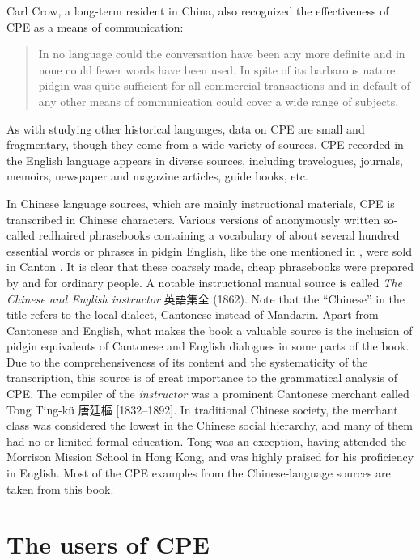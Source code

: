 \documentclass[english,output=paper,colorlinks,citecolor=brown]{../langscibook}
\begin{document}
Carl Crow, a long-term resident in China, also recognized the effectiveness of CPE as a means of communication:

\begin{quote}
    In no language could the conversation have been any more definite and in none could fewer words have been used. In spite of its barbarous nature pidgin was quite sufficient for all commercial transactions and in default of any other means of communication could cover a wide range of subjects. \citep[31]{Crow2011}
\end{quote}

As with studying other historical languages, data on CPE are small and fragmentary, though they come from a wide variety of sources. CPE recorded in the English language appears in diverse sources, including travelogues, journals, memoirs, newspaper and magazine articles, guide books, etc.

In Chinese language sources, which are mainly instructional materials, CPE is transcribed in Chinese characters. Various versions of anonymously written so-called redhaired phrasebooks containing a vocabulary of about several hundred essential words or phrases in pidgin English, like the one mentioned in \citet{Hunter1882}, were sold in Canton \citep{Bolton2003}. It is clear that these coarsely made, cheap phrasebooks were prepared by and for ordinary people. A notable instructional manual source is called \textit{The Chinese and English instructor} {\cjkfont 英語集全} (1862). Note that the “Chinese” in the title refers to the local dialect, Cantonese instead of Mandarin. Apart from Cantonese and English, what makes the book a valuable source is the inclusion of pidgin equivalents of Cantonese and English dialogues in some parts of the book. Due to the comprehensiveness of its content and the systematicity of the transcription, this source is of great importance to the grammatical analysis of CPE. The compiler of the \textit{instructor} was a prominent Cantonese merchant called Tong Ting-kü {\cjkfont 唐廷樞} [1832--1892]. In traditional Chinese society, the merchant class was considered the lowest in the Chinese social hierarchy, and many of them had no or limited formal education. Tong was an exception, having attended the Morrison Mission School in Hong Kong, and was highly praised for his proficiency in English. Most of the CPE examples from the Chinese-language sources are taken from this book.

\section{The users of CPE}\label{sec:7:4}
\end{document}
